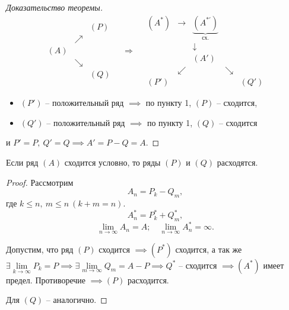\begin{proof}[Доказательство теоремы]
    \[
        \begin{array}{ccc}
                &          & (P) \\
                & \nearrow &     \\
            (A) &          &     \\
                & \searrow &     \\
                &          & (Q)
        \end{array} \quad \Longrightarrow \quad \begin{array}{ccccc}
            (A^*) & \rightarrow & \underbrace{(A^{*'})}_{\text{сх.}} &          &      \\
                  &             & \downarrow                         &          &      \\
                  &             & (A')                               &          &      \\
                  & \swarrow    &                                    & \searrow &      \\
            (P')  &             &                                    &          & (Q')
        \end{array}
    \]

    \begin{itemize}
        \item $(P')$ -- положительный ряд $\implies$ по пункту 1, $(P)$ -- сходится,
        \item $(Q')$ -- положительный ряд $\implies$ по пункту 1, $(Q)$ -- сходится
    \end{itemize}
    и $P' = P, \ Q' = Q \implies A' = P - Q = A$.
\end{proof}

\begin{lemma}
    Если ряд $(A)$ сходится условно, то ряды $(P)$ и $(Q)$ расходятся.
\end{lemma}

\begin{proof}
    Рассмотрим
    \[
        A_n = P_k - Q_m,
    \] где $k \leqslant n, \ m \leqslant n \ (k + m = n)$.
    \[
        A_n^* = P_k^* + Q_m^*,
    \]
    \[
        \underset{n\rightarrow\infty}{\lim} A_n = A; \quad \underset{n\rightarrow\infty}{\lim}A_n^* = \infty.
    \]

    Допустим, что ряд $(P)$ сходится $\implies (P^*)$ сходится, а так же $\exists \underset{k\rightarrow\infty}{\lim}P_k = P \implies \exists\underset{m\rightarrow\infty}{\lim}Q_m = A - P \implies Q^*$ -- сходится $\implies (A^*)$ имеет предел. Противоречие $\implies (P)$ расходится.

    Для $(Q)$ -- аналогично.
\end{proof}

